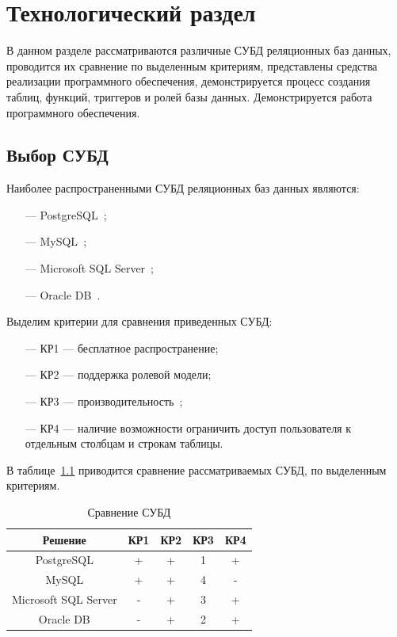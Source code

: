 \chapter{Технологический раздел}
В данном разделе рассматриваются различные СУБД реляционных баз данных, проводится их сравнение по выделенным критериям, представлены  средства реализации программного обеспечения, демонстрируется процесс создания таблиц, функций, триггеров и ролей базы данных. Демонстрируется работа программного обеспечения.

\section{Выбор СУБД}
Наиболее распространенными СУБД реляционных баз данных являются:
\begin{itemize}
    \item[---] PostgreSQL~\cite{Psql};
    \item[---] MySQL~\cite{MySQL};
    \item[---] Microsoft SQL Server~\cite{MSSQL};
    \item[---] Oracle DB~\cite{Oracle}.
\end{itemize}

Выделим критерии для сравнения приведенных СУБД:
\begin{itemize}
    \item[---] КР1 --- бесплатное распространение;
    \item[---] КР2 --- поддержка ролевой модели;
    \item[---] КР3 --- производительность~\cite{ismail2019oracle, solarz2020oracle};
    \item[---] КР4 --- наличие возможности ограничить доступ пользователя к отдельным столбцам и строкам таблицы.
\end{itemize}

В таблице~\ref{tbl:versus_subd} приводится сравнение рассматриваемых СУБД, по выделенным критериям.

\begin{table}[H]
    \begin{center}
        \caption{Сравнение СУБД}
        \begin{tabular}{|c|c|c|c|c|}
            \hline
            \textbf{Решение} & \textbf{КР1} & \textbf{КР2} & \textbf{КР3} & \textbf{КР4} \\
            \hline
            PostgreSQL & + & + & 1 & + \\
            \hline
            MySQL & + & + & 4 & - \\
            \hline
            Microsoft SQL Server & - & + & 3 & + \\
            \hline
            Oracle DB & - & + & 2 & + \\
            \hline
        \end{tabular}
        \label{tbl:versus_subd}
    \end{center}
\end{table}

